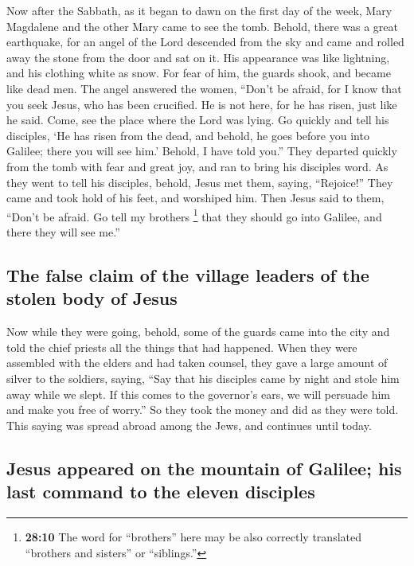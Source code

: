  Now after the Sabbath, as it began to dawn on the first
day of the week, Mary Magdalene and the other Mary came to see the tomb.
 Behold, there was a great earthquake, for an angel of the
Lord descended from the sky and came and rolled away the stone from the
door and sat on it.  His appearance was like lightning,
and his clothing white as snow.  For fear of him, the
guards shook, and became like dead men.  The angel
answered the women, ``Don't be afraid, for I know that you seek Jesus,
who has been crucified.  He is not here, for he has risen,
just like he said. Come, see the place where the Lord was lying.
 Go quickly and tell his disciples, `He has risen from the
dead, and behold, he goes before you into Galilee; there you will see
him.' Behold, I have told you.''  They departed quickly
from the tomb with fear and great joy, and ran to bring his disciples
word.  As they went to tell his disciples, behold, Jesus
met them, saying, ``Rejoice!'' They came and took hold of his feet, and
worshiped him.  Then Jesus said to them, ``Don't be
afraid. Go tell my brothers \footnote{\textbf{28:10} The word for
  ``brothers'' here may be also correctly translated ``brothers and
  sisters'' or ``siblings.''} that they should go into Galilee, and
there they will see me.''

\hypertarget{the-false-claim-of-the-village-leaders-of-the-stolen-body-of-jesus}{%
\subsection{The false claim of the village leaders of the stolen body of
Jesus}\label{the-false-claim-of-the-village-leaders-of-the-stolen-body-of-jesus}}

 Now while they were going, behold, some of the guards
came into the city and told the chief priests all the things that had
happened.  When they were assembled with the elders and
had taken counsel, they gave a large amount of silver to the soldiers,
 saying, ``Say that his disciples came by night and stole
him away while we slept.  If this comes to the governor's
ears, we will persuade him and make you free of worry.'' 
So they took the money and did as they were told. This saying was spread
abroad among the Jews, and continues until today.

\hypertarget{jesus-appeared-on-the-mountain-of-galilee-his-last-command-to-the-eleven-disciples}{%
\subsection{Jesus appeared on the mountain of Galilee; his last command
to the eleven
disciples}\label{jesus-appeared-on-the-mountain-of-galilee-his-last-command-to-the-eleven-disciples}}

